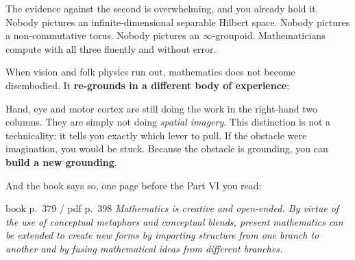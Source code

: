 \noindent The evidence against the second is overwhelming, and you already hold it. Nobody pictures
an infinite-dimensional separable Hilbert space. Nobody pictures a non-commutative torus. Nobody
pictures an $\infty$-groupoid. Mathematicians compute with all three fluently and without error.

\begin{ideabox}[title={How the escape actually works: substituting the source domain}]
When vision and folk physics run out, mathematics does not become disembodied. It \textbf{re-grounds
in a different body of experience}:
\begin{center}
\end{center}
\vspace{2pt}
Hand, eye and motor cortex are still doing the work in the right-hand two columns. They are simply
not doing \emph{spatial imagery}. This distinction is not a technicality: it tells you exactly which
lever to pull. If the obstacle were imagination, you would be stuck. Because the obstacle is
grounding, you can \textbf{build a new grounding}.
\end{ideabox}

\noindent And the book says so, one page before the Part VI you read:

\begin{bookquote}{book p.~379 / pdf p.~398}
\textit{Mathematics is creative and open-ended. By virtue of the use of conceptual metaphors and
conceptual blends, present mathematics can be extended to create new forms by importing structure
from one branch to another and by fusing mathematical ideas from different branches.}
\end{bookquote}

